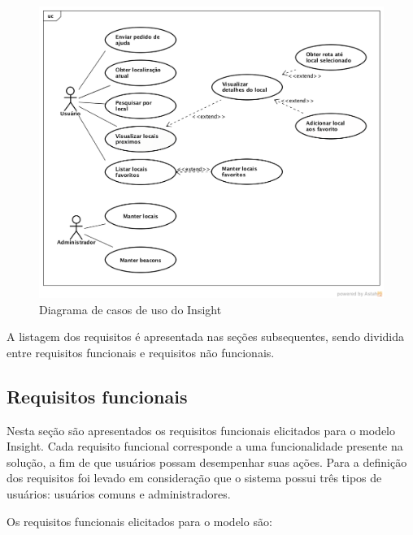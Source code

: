 \documentclass[english,brazilian]{UNISINOSmonografia}
\begin{document}
	\begin{figure}[!ht]
		\caption{Diagrama de casos de uso do Insight}
		\label{fig:diagramaCasosDeUso}
		\centering%
		\begin{minipage}{,9\textwidth}
			\includegraphics[width=\textwidth]{imgs/casosDeUso}
		\end{minipage}
	\end{figure}
	

A listagem dos requisitos é apresentada nas seções subsequentes, sendo dividida entre requisitos funcionais e requisitos não funcionais.

\subsection{Requisitos funcionais} 
Nesta seção são apresentados os requisitos funcionais elicitados para o modelo Insight. Cada requisito funcional corresponde a uma funcionalidade presente na solução, a fim de que usuários possam desempenhar suas ações. Para a definição dos requisitos foi levado em consideração que o sistema possui três tipos de usuários: usuários comuns e administradores.

Os requisitos funcionais elicitados para o modelo são:
\end{document}
